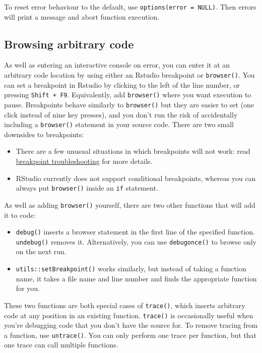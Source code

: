 To reset error behaviour to the default, use
\texttt{options(error\ =\ NULL)}. Then errors will print a message and
abort function execution.

\hypertarget{browsing-arbitrary-code}{%
\subsection{Browsing arbitrary code}\label{browsing-arbitrary-code}}

As well as entering an interactive console on error, you can enter it at
an arbitrary code location by using either an Rstudio breakpoint or
\texttt{browser()}. You can set a breakpoint in Rstudio by clicking to
the left of the line number, or pressing \texttt{Shift\ +\ F9}.
Equivalently, add \texttt{browser()} where you want execution to pause.
Breakpoints behave similarly to \texttt{browser()} but they are easier
to set (one click instead of nine key presses), and you don't run the
risk of accidentally including a \texttt{browser()} statement in your
source code. There are two small downsides to breakpoints:
 

\begin{itemize}
\item
  There are a few unusual situations in which breakpoints will not work:
  read
  \href{http://www.rstudio.com/ide/docs/debugging/breakpoint-troubleshooting}{breakpoint
  troubleshooting} for more details.
\item
  RStudio currently does not support conditional breakpoints, whereas
  you can always put \texttt{browser()} inside an \texttt{if} statement.
\end{itemize}

As well as adding \texttt{browser()} yourself, there are two other
functions that will add it to code:

\begin{itemize}
\item
  \texttt{debug()} inserts a browser statement in the first line of the
  specified function. \texttt{undebug()} removes it. Alternatively, you
  can use \texttt{debugonce()} to browse only on the next run.
\item
  \texttt{utils::setBreakpoint()} works similarly, but instead of taking
  a function name, it takes a file name and line number and finds the
  appropriate function for you. 
\end{itemize}

These two functions are both special cases of \texttt{trace()}, which
inserts arbitrary code at any position in an existing function.
\texttt{trace()} is occasionally useful when you're debugging code that
you don't have the source for. To remove tracing from a function, use
\texttt{untrace()}. You can only perform one trace per function, but
that one trace can call multiple functions. 


